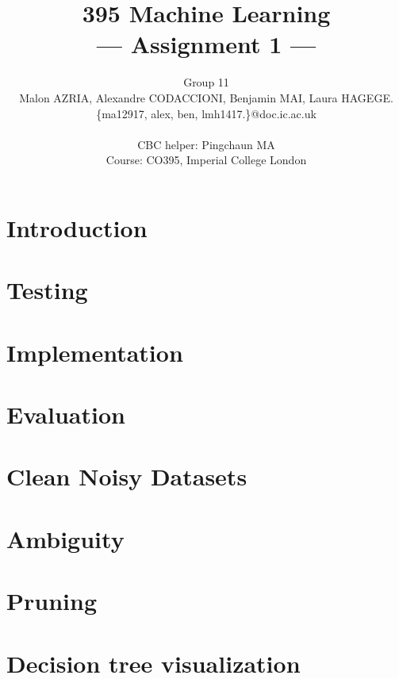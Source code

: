 \documentclass[a4paper,11pt]{article}
\title{395 Machine Learning\\\Large{--- Assignment 1 ---}}
\author{Group 11\\Malon AZRIA, Alexandre CODACCIONI, Benjamin MAI, Laura HAGEGE.\\
       \{ma12917, alex, ben, lmh1417.\}@doc.ic.ac.uk\\ \\
       \small{CBC helper: Pingchaun MA}\\
       \small{Course: CO395, Imperial College London}
}
\begin{document}
\maketitle

\section{Introduction}
    

\section{Testing}
    

\section{Implementation}
    
 
    
\section{Evaluation}
    
	
\section{Clean Noisy Datasets}
     


\section{Ambiguity}
	

\newpage 
\section{Pruning}
    

\newpage
\section{Decision tree visualization}
    
\end{document}
